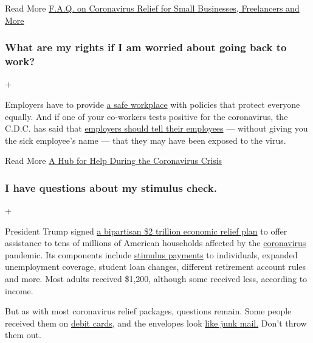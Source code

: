  Read More
\href{https://www.nytimes.com/article/small-business-loans-stimulus-grants-freelancers-coronavirus.html}{F.A.Q.
on Coronavirus Relief for Small Businesses, Freelancers and More}

\hypertarget{what-are-my-rights-if-i-am-worried-about-going-back-to-work}{%
\subsubsection{What are my rights if I am worried about going back to
work?}\label{what-are-my-rights-if-i-am-worried-about-going-back-to-work}}

+

Employers have to provide
\href{https://www.osha.gov/SLTC/covid-19/standards.html}{a safe
workplace} with policies that protect everyone equally. And if one of
your co-workers tests positive for the coronavirus, the C.D.C. has said
that
\href{https://www.cdc.gov/coronavirus/2019-ncov/community/guidance-business-response.html}{employers
should tell their employees} --- without giving you the sick employee's
name --- that they may have been exposed to the virus.

 Read More
\href{https://www.nytimes.com/article/coronavirus-money-unemployment.html}{A
Hub for Help During the Coronavirus Crisis}

\hypertarget{i-have-questions-about-my-stimulus-check}{%
\subsubsection{I have questions about my stimulus
check.}\label{i-have-questions-about-my-stimulus-check}}

+

President Trump signed
\href{https://www.nytimes.com/2020/03/26/us/coronavirus-senate-stimulus-package.html}{a
bipartisan \$2 trillion economic relief plan} to offer assistance to
tens of millions of American households affected by the
\href{https://www.nytimes.com/2020/05/07/us/coronavirus-stimulus-package.html}{coronavirus}
pandemic. Its components include
\href{https://www.nytimes.com/2020/06/25/us/politics/coronavirus-stimulus-dead-people.html}{stimulus
payments} to individuals, expanded unemployment coverage, student loan
changes, different retirement account rules and more. Most adults
received \$1,200, although some received less, according to income.

But as with most coronavirus relief packages, questions remain. Some
people received them on
\href{https://www.washingtonpost.com/business/2020/06/01/faq-stimulus-debit-card/}{debit
cards,} and the envelopes look
\href{https://twitter.com/zackstanton/status/1263908922899009536}{like
junk mail.} Don't throw them out.

